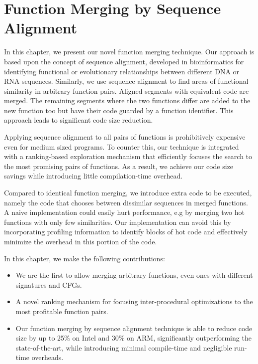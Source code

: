 
\chapter{Function Merging by Sequence Alignment} \label{chp:cgo19}

In this chapter, we present our novel function merging technique.
Our approach is based upon the concept of sequence alignment, developed in
bioinformatics for identifying functional or evolutionary relationships between
different DNA or RNA sequences. Similarly, we use sequence alignment to find
areas of functional similarity in arbitrary function pairs. Aligned segments
with equivalent code are merged. The remaining segments where the two functions
differ are added to the new function too but have their code guarded by a
function identifier. This approach leads to significant code size reduction.

Applying sequence alignment to all pairs of functions is prohibitively expensive
even for medium sized programs. To counter this, our technique is integrated with
a ranking-based exploration mechanism that efficiently focuses the search to the most
promising pairs of functions. %
As a result, we achieve our code size savings while introducing little compilation-time
overhead.

Compared to identical function merging, we introduce extra code to be executed,
namely the code that chooses between dissimilar sequences in merged functions.
A naive implementation could easily hurt performance, e.g by merging two hot functions
with only few similarities. Our implementation can avoid this by incorporating
profiling information to identify blocks of hot code and effectively minimize 
the overhead in this portion of the code.

In this chapter, we make the following contributions:
\begin{itemize}
  \item We are the first to allow merging arbitrary functions, even ones with
    different signatures and CFGs.
  \item A novel ranking mechanism for focusing inter-procedural optimizations
    to the most profitable function pairs.
  \item Our function merging by sequence alignment technique is able to reduce
     code size by up to 25\% on Intel and 30\% on ARM, significantly outperforming the
    state-of-the-art, while introducing minimal compile-time and negligible run-time overheads.
\end{itemize}







